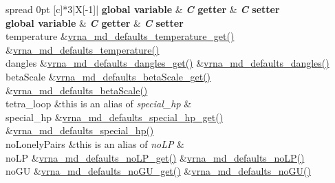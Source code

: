 \begin{DoxyRefList}
\tabulinesep=1mm
\begin{longtabu} spread 0pt [c]{*{3}{|X[-1]}|}
\hline
\rowcolor{\tableheadbgcolor}\textbf{ global variable  }&\textbf{ {\itshape C} getter  }&\textbf{ {\itshape C} setter   }\\
\endfirsthead
\hline
\endfoot
\hline
\rowcolor{\tableheadbgcolor}\textbf{ global variable  }&\textbf{ {\itshape C} getter  }&\textbf{ {\itshape C} setter   }\\
\endhead
temperature  &\mbox{\hyperlink{group__model__details_ga96b24a74437f9ba46c4e06343155bf46}{vrna\+\_\+md\+\_\+defaults\+\_\+temperature\+\_\+get()}}  &\mbox{\hyperlink{group__model__details_gaf9e527e9a2f7e6fd6e42bc6e602f5445}{vrna\+\_\+md\+\_\+defaults\+\_\+temperature()}}   \\
dangles  &\mbox{\hyperlink{group__model__details_ga67ca06f95ae133778c79a4493c9817b8}{vrna\+\_\+md\+\_\+defaults\+\_\+dangles\+\_\+get()}}  &\mbox{\hyperlink{group__model__details_gac76a5374def8e5e4e644ff6e4cc72dee}{vrna\+\_\+md\+\_\+defaults\+\_\+dangles()}}   \\
beta\+Scale  &\mbox{\hyperlink{group__model__details_gabb8780f5410c52f970d75b044059bd09}{vrna\+\_\+md\+\_\+defaults\+\_\+beta\+Scale\+\_\+get()}}  &\mbox{\hyperlink{group__model__details_gae984567db36c3f9b8731ecc917abf3a2}{vrna\+\_\+md\+\_\+defaults\+\_\+beta\+Scale()}}   \\
tetra\+\_\+loop  &this is an alias of {\itshape special\+\_\+hp}  &\\
special\+\_\+hp  &\mbox{\hyperlink{group__model__details_ga1d68a6efdaa1253cc63fd9cd06452559}{vrna\+\_\+md\+\_\+defaults\+\_\+special\+\_\+hp\+\_\+get()}}  &\mbox{\hyperlink{group__model__details_gafff6449a02744add0308e653230c15fc}{vrna\+\_\+md\+\_\+defaults\+\_\+special\+\_\+hp()}}   \\
no\+Lonely\+Pairs  &this is an alias of {\itshape no\+LP}  &\\
no\+LP  &\mbox{\hyperlink{group__model__details_ga934344888fbacaed538bbbfe910f2aa6}{vrna\+\_\+md\+\_\+defaults\+\_\+no\+L\+P\+\_\+get()}}  &\mbox{\hyperlink{group__model__details_ga2f88ffc393ac9d7987849c965fd29ea8}{vrna\+\_\+md\+\_\+defaults\+\_\+no\+L\+P()}}   \\
no\+GU  &\mbox{\hyperlink{group__model__details_ga5faa7d4e536d7fe36ec25428c0cf2563}{vrna\+\_\+md\+\_\+defaults\+\_\+no\+G\+U\+\_\+get()}}  &\mbox{\hyperlink{group__model__details_ga98218f85c7a957a1d1ddf4627fdf5a39}{vrna\+\_\+md\+\_\+defaults\+\_\+no\+G\+U()}}   \\

\end{longtabu}
\end{DoxyRefList}
